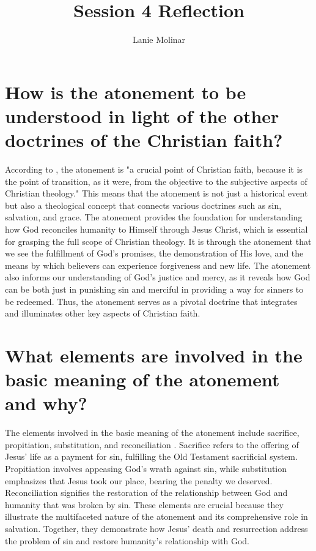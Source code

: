 \documentclass[stu,12pt,floatsintext]{apa7}
\title{Session 4 Reflection}
\author{Lanie Molinar}
\begin{document}
\maketitle
\thispagestyle{plain}
\pagestyle{plain}

\section{How is the atonement to be understood in light of the other doctrines of the Christian faith?}

According to \textcite[p. 276]{ericksonIntroducingChristianDoctrine2015}, the atonement is "a crucial point of Christian faith, because it is the point of transition, as it were, from the objective to the subjective aspects of Christian theology." This means that the atonement is not just a historical event but also a theological concept that connects various doctrines such as sin, salvation, and grace. The atonement provides the foundation for understanding how God reconciles humanity to Himself through Jesus Christ, which is essential for grasping the full scope of Christian theology. It is through the atonement that we see the fulfillment of God's promises, the demonstration of His love, and the means by which believers can experience forgiveness and new life. The atonement also informs our understanding of God's justice and mercy, as it reveals how God can be both just in punishing sin and merciful in providing a way for sinners to be redeemed. Thus, the atonement serves as a pivotal doctrine that integrates and illuminates other key aspects of Christian faith.

\section{What elements are involved in the basic meaning of the atonement and why?}

The elements involved in the basic meaning of the atonement include sacrifice, propitiation, substitution, and reconciliation \parencite[pp. 288-289] {ericksonIntroducingChristianDoctrine2015}. Sacrifice refers to the offering of Jesus' life as a payment for sin, fulfilling the Old Testament sacrificial system. Propitiation involves appeasing God's wrath against sin, while substitution emphasizes that Jesus took our place, bearing the penalty we deserved. Reconciliation signifies the restoration of the relationship between God and humanity that was broken by sin. These elements are crucial because they illustrate the multifaceted nature of the atonement and its comprehensive role in salvation. Together, they demonstrate how Jesus' death and resurrection address the problem of sin and restore humanity's relationship with God.
\end{document}
